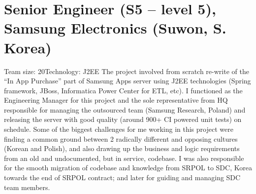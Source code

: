 \section{Senior Engineer (S5 -- level 5), Samsung Electronics (Suwon, S. Korea)}
         {Team size: 20}{Technology: J2EE}
         {The project involved from scratch re-write of the ``In App Purchase'' part of Samsung Apps
server using J2EE technologies (Spring framework, JBoss, Informatica Power Center for
ETL, etc). I functioned as the Engineering Manager for this project and the sole
representative from HQ responsible for managing the outsourced team (Samsung Research,
Poland) and releasing the server with good quality (around 900+ CI powered unit tests) on schedule. Some of the biggest challenges for me working in this project were finding a
common ground between 2 radically different and opposing cultures (Korean and Polish),
and also drawing up the business and logic requirements from an old and undocumented, but
in service, codebase. I was also responsible for the smooth migration of codebase and
knowledge from SRPOL to SDC, Korea towards the end of SRPOL contract; and later for
guiding and managing SDC team members.}

